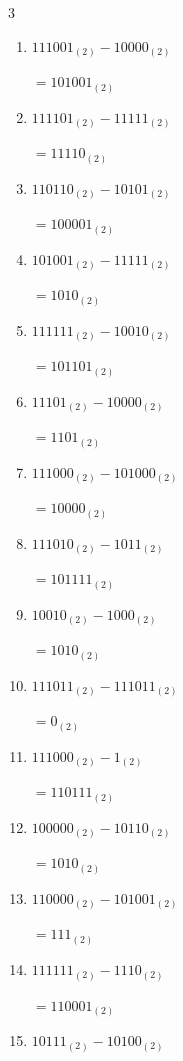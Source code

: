 \begin{multicols}{3}
\begin{enumerate}
  \item $111001_{(2)} - 10000_{(2)}$

        $=101001_{(2)}$

  \item $111101_{(2)} - 11111_{(2)}$

        $=11110_{(2)}$

  \item $110110_{(2)} - 10101_{(2)}$

        $=100001_{(2)}$

  \item $101001_{(2)} - 11111_{(2)}$

        $=1010_{(2)}$

  \item $111111_{(2)} - 10010_{(2)}$

        $=101101_{(2)}$

  \item $11101_{(2)} - 10000_{(2)}$

        $=1101_{(2)}$

\columnbreak %

  \item $111000_{(2)} - 101000_{(2)}$

        $=10000_{(2)}$

  \item $111010_{(2)} - 1011_{(2)}$

        $=101111_{(2)}$

  \item $10010_{(2)} - 1000_{(2)}$

        $=1010_{(2)}$

  \item $111011_{(2)} - 111011_{(2)}$

        $=0_{(2)}$

  \item $111000_{(2)} - 1_{(2)}$

        $=110111_{(2)}$

  \item $100000_{(2)} - 10110_{(2)}$

        $=1010_{(2)}$

  \item $110000_{(2)} - 101001_{(2)}$

        $=111_{(2)}$

  \item $111111_{(2)} - 1110_{(2)}$

        $=110001_{(2)}$

  \item $10111_{(2)} - 10100_{(2)}$


\end{enumerate}
\end{multicols}
